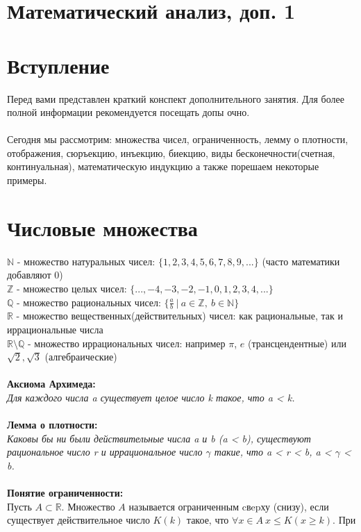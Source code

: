 \documentclass[a4paper]{article}
\begin{document}
 \centering\section*{Математический анализ, доп. 1}
 \raggedright
 \section{Вступление}
\justifying
 Перед вами представлен краткий конспект дополнительного занятия. Для более полной информации рекомендуется посещать допы очно.
 \\\\
 Сегодня мы рассмотрим: множества чисел, ограниченность, лемму о плотности, отображения, сюръекцию, инъекцию, биекцию, виды бесконечности(счетная, континуальная), математическую индукцию а также порешаем некоторые примеры. 
\section{Числовые множества}
$\mathbb{N}$ - множество натуральных чисел: $\{1, 2, 3, 4, 5, 6, 7, 8, 9, ...\} $ (часто математики добавляют 0) \\
$\mathbb{Z}$ - множество целых чисел: $\{..., -4, -3, -2, -1, 0, 1, 2, 3, 4, ...\}$ \\
$\mathbb{Q}$ - множество рациональных чисел: $\{\frac{a}{b} \ | \ a \in \mathbb{Z},\ b \in \mathbb{N}\}$\\
$\mathbb{R}$ - множество вещественных(действительных) чисел: как рациональные, так и иррациональные числа\\
$\mathbb{R \setminus Q}$ - множество иррациональных чисел: например $\pi$, $e$ (трансцендентные) или $\sqrt{2}, \sqrt{3}$ (алгебраические)\\\\
\textbf{Аксиома Архимеда:}\\
\textit{Для каждого числа a существует целое число k такое, что a < k.}\\\\
\textbf{Лемма о плотности:}\\\textit{Каковы бы ни были действительные числа a и b (a < b),
существуют рациональное число r и иррациональное число $\gamma$ такие, что a < r < b,
a < $\gamma$ < b.}\\\\
\textbf{Понятие ограниченности:}\\
Пусть $A  \subset \mathbb{R}$. Множество $A$ называется ограниченным cвepху (снизу), если существует действительное число $K (k)$ такое, что $\forall x \in A \ x \leqslant K (x \geqslant k)$. При
\end{document}
